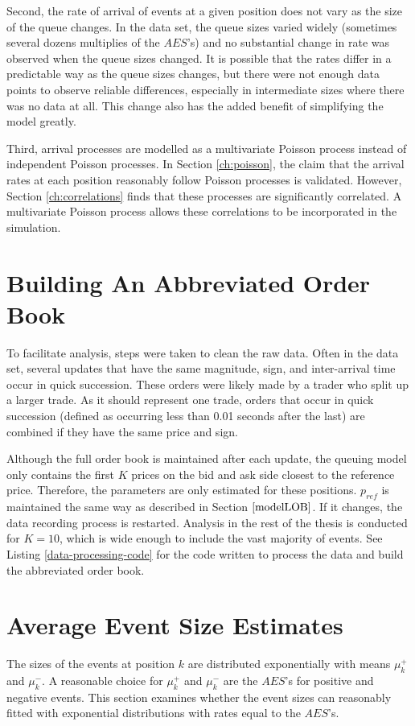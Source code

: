 Second, the rate of arrival of events at a given position does not vary as the size of the queue changes. In the data set, the queue sizes varied widely (sometimes several dozens multiplies of the $AES$'s) and no substantial change in rate was observed when the queue sizes changed. It is possible that the rates differ in a predictable way as the queue sizes changes, but there were not enough data points to observe reliable differences, especially in intermediate sizes where there was no data at all. This change also has the added benefit of simplifying the model greatly.

Third, arrival processes are modelled as a multivariate Poisson process instead of independent Poisson processes. In Section \ref{ch:poisson}, the claim that the arrival rates at each position reasonably follow Poisson processes is validated. However, Section \ref{ch:correlations} finds that these processes are significantly correlated. A multivariate Poisson process allows these correlations to be incorporated in the simulation.

\section{Building An Abbreviated Order Book}
To facilitate analysis, steps were taken to clean the raw data. Often in the data set, several updates that have the same magnitude, sign, and inter-arrival time occur in quick succession. These orders were likely made by a trader who split up a larger trade. As it should represent one trade, orders that occur in quick succession (defined as occurring less than 0.01 seconds after the last) are combined if they have the same price and sign. 

Although the full order book is maintained after each update, the queuing model only contains the first $K$ prices on the bid and ask side closest to the reference price. Therefore, the parameters are only estimated for these positions. $p_{ref}$ is maintained the same way as described in Section $\ref{modelLOB}$. If it changes, the data recording process is restarted. Analysis in the rest of the thesis is conducted for $K=10$, which is wide enough to include the vast majority of events. See Listing \ref{data-processing-code} for the code written to process the data and build the abbreviated order book.

\section{Average Event Size Estimates}\label{ch:event_sizes}
The sizes of the events at position $k$ are distributed exponentially with means $\mu^+_k$ and $\mu^-_k$. A reasonable choice for $\mu^+_k$ and $\mu^-_k$ are the $AES$'s for positive and negative events. This section examines whether the event sizes can reasonably fitted with exponential distributions with rates equal to the $AES$'s. 

